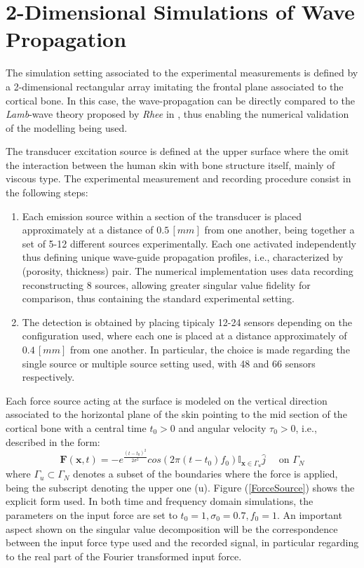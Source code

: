 \section{2-Dimensional Simulations of Wave Propagation}
The simulation setting associated to the experimental measurements is defined by a 2-dimensional rectangular array imitating the frontal plane associated to the cortical bone. In this case, the wave-propagation can be directly compared to the \textit{Lamb}-wave  theory proposed by \textit{Rhee} in \cite{Rhee2007}, thus enabling the numerical validation of the modelling being used. 

The transducer excitation source is defined at the upper surface where the omit the interaction between the human skin with bone structure itself, mainly of viscous type.
The experimental measurement and recording procedure consist in the following steps:
\begin{enumerate}
    \item Each emission source within a section of the transducer is placed approximately at a distance of $0.5 \, [mm]$ from one another, being together a set of 5-12 different sources experimentally. Each one activated independently thus defining unique wave-guide propagation profiles, i.e., characterized by (porosity, thickness) pair. The numerical implementation uses data recording reconstructing 8 sources, allowing greater singular value fidelity for comparison, thus containing the standard experimental setting.
    
    \item The detection is obtained by placing tipicaly 12-24 sensors depending on the configuration used, where each one is placed at a distance approximately of $0.4 \, [mm]$ from one another. In particular, the choice is made regarding the single source or multiple source setting used, with 48 and 66 sensors respectively.
\end{enumerate}
Each force source acting at the surface is modeled on the vertical direction associated to the horizontal plane of the skin pointing to the mid section of the cortical bone with a central time $t_0 > 0$ and angular velocity $\tau_0 > 0$, i.e., described in the form:
\begin{equation}
    \label{Force-eq}
    \mathbf{F}(\mathbf{x},t) = - e^{\frac{(t-t_0)^2}{2\sigma^2}} cos( 2 \pi (t-t_0) f_0 ) \mathbb{I}_{\mathbf{x} \in \Gamma_u} \hat{j} \quad \text{ on } \Gamma_N
\end{equation}
where $\Gamma_u \subset \Gamma_N$ denotes a subset of the boundaries where the force is applied, being the subscript denoting the upper one (u). Figure (\ref{ForceSource}) shows the explicit form used. In both time and frequency domain simulations, the parameters on the input force are set to $t_0 = 1, \sigma_0 = 0.7, f_0 = 1$. An important aspect shown on the singular value decomposition will be the correspondence between the input force type used and the recorded signal, in particular regarding to the real part of the Fourier transformed input force.

